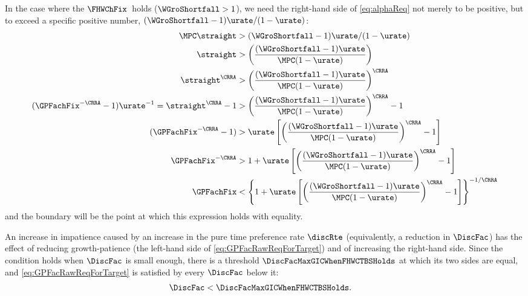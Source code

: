 \documentclass{econark}
\begin{document}
In the case where the $\FHWChFix$~holds ($\WGroShortfall > 1$), we need the right-hand side of \eqref{eq:alphaReq} not merely to be positive, but to exceed a specific positive number, $(\WGroShortfall-1)\urate/(1-\urate)$:  
\begin{equation}\begin{gathered}\begin{aligned}
    \MPC \straight & >  (\WGroShortfall-1)\urate/(1-\urate)
\\   \straight & >  \left(\frac{(\WGroShortfall-1)\urate}{\MPC (1-\urate)}\right)
\\   \straight^{\CRRA} & >  \left(\frac{(\WGroShortfall-1)\urate}{\MPC (1-\urate)}\right)^{\CRRA}
\\  (\GPFachFix^{-\CRRA}-1)\urate^{-1} = \straight^{\CRRA}-1 & >  \left(\frac{(\WGroShortfall-1)\urate}{\MPC (1-\urate)}\right)^{\CRRA}-1
\\  (\GPFachFix^{-\CRRA}-1) & >  \urate \left[\left(\frac{(\WGroShortfall-1)\urate}{\MPC (1-\urate)}\right)^{\CRRA}-1\right]
\\  \GPFachFix^{-\CRRA} & >  1  + \urate \left[\left(\frac{(\WGroShortfall-1)\urate}{\MPC (1-\urate)}\right)^{\CRRA}-1\right]
\\  \GPFachFix & <  \left\{1  + \urate \left[\left(\frac{(\WGroShortfall-1)\urate}{\MPC (1-\urate)}\right)^{\CRRA}-1\right] \right\}^{-1/\CRRA} \label{eq:GPFacRawReqForTarget}
\end{aligned}\end{gathered}\end{equation}
and the boundary will be the point at which this expression holds with equality.  

An increase in impatience caused by an increase in the pure time preference rate $\discRte$ (equivalently, a reduction in $\DiscFac$) has the effect of reducing growth-patience (the left-hand side of \eqref{eq:GPFacRawReqForTarget}) and of increasing the right-hand side.  Since the condition holds when $\DiscFac$ is small enough, there is a threshold $\DiscFacMaxGICWhenFHWCTBSHolds$ at which its two sides are equal, and \eqref{eq:GPFacRawReqForTarget} is satisfied by every $\DiscFac$ below it:
\begin{equation}\begin{gathered}\begin{aligned}
  \DiscFac & <  \DiscFacMaxGICWhenFHWCTBSHolds \label{eq:DiscountMaxGICWhenFHWCTBSHolds}
.\end{aligned}\end{gathered}\end{equation}
\end{document}
